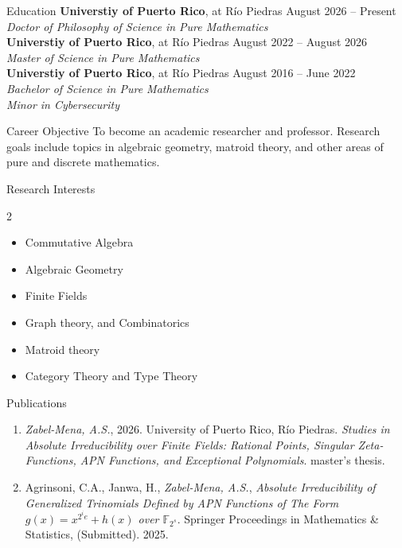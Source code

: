 \documentclass{resume}
\begin{document}
\begin{rSection}{Education}
 \textbf{Universtiy of Puerto Rico}, at R\'io Piedras
  \hfill August 2026 -- Present \\
  \textit{Doctor of Philosophy of Science in Pure Mathematics} \\

  \textbf{Universtiy of Puerto Rico}, at R\'io Piedras
  \hfill August 2022 -- August 2026  \\
  \textit{Master of Science in Pure Mathematics} \\

  \textbf{Universtiy of Puerto Rico}, at R\'io Piedras
  \hfill August 2016 -- June 2022  \\
  \textit{Bachelor of Science in Pure Mathematics}  \\
  \textit{Minor in Cybersecurity}
\end{rSection}

\begin{rSection}{Career Objective}
  To become an academic researcher and professor. Research goals
  include topics in algebraic geometry, matroid theory, and other
  areas of pure and discrete mathematics.
\end{rSection}

\begin{rSection}{Research Interests}
  \begin{multicols}{2}
    \begin{itemize}
      \item Commutative Algebra

      \item Algebraic Geometry

      \item Finite Fields

      \item Graph theory, and Combinatorics

      \item Matroid theory

      \item Category Theory and Type Theory
    \end{itemize}
  \end{multicols}
\end{rSection}


\begin{rSection}{Publications}
  \begin{enumerate}
    \item \textit{Zabel-Mena, A.S.}, 2026. University of Puerto Rico, R\'io
      Piedras. \textit{Studies in Absolute Irreducibility over Finite
      Fields: Rational Points, Singular Zeta-Functions, APN Functions,
      and Exceptional Polynomials}. master's thesis.
    \item Agrinsoni, C.A., Janwa, H., \textit{Zabel-Mena, A.S.},
      \textit{Absolute Irreducibility of Generalized
        Trinomials Defined by APN Functions of The Form
      $g(x)=x^{2^ie}+h(x)$ over $\mathbb{F}_{2^s}$}. Springer
      Proceedings in Mathematics \& Statistics, (Submitted).
      2025.
  \end{enumerate}
\end{rSection}
\end{document}
